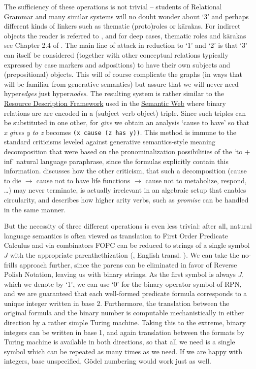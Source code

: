 \documentclass[output=paper,colorlinks=true,citecolor=brown]{langscibook}
\begin{document}
The sufficiency of these operations is not trivial -- students of Relational
Grammar and many similar systems will no doubt wonder about `3' and perhaps
different kinds of linkers such as thematic (proto)roles or k\={a}rakas. For
indirect objects the reader is referred to \citet{Kornai:2012}, and for deep
cases, thematic roles and k\={a}rakas see Chapter 2.4 of \citet{Kornai:2022}.
The main line of attack in reduction to `1' and `2' is that `3' can itself be
considered (together with other conceptual relations typically expressed by
case markers and adpositions) to have their own subjects and (prepositional)
objects. This will of course complicate the graphs (in ways that will be
familiar from generative semantics) but assure that we will never need
hyper{\it edges} just hyper{\it nodes}. The resulting system is rather similar
to the
\href{https://en.wikipedia.org/wiki/Resource_Description_Framework}{Resource
  Description Framework} used in the
\href{https://en.wikipedia.org/wiki/Semantic_Web}{Semantic Web} where binary
relations are are encoded in a (subject verb object) triple. Since such
triples can be substituted in one other, for {\it give} we obtain an analysis
`cause to have' so that {\it x gives y to z} becomes \texttt{(x cause (z has
  y))}. This method is immune to the standard criticisms \citep{Fodor:1970}
leveled against generative semantics-style meaning decomposition that were
based on the pronominalization possibilities of the `to + inf' natural
language paraphrase, since the formulas explicitly contain this information.
\citet{Kornai:2010} discusses how the other criticism, that such a
decomposition (cause to die $\rightarrow$ cause not to have life functions
$\rightarrow$ cause not to metabolize, respond, \ldots) may never terminate,
is actually irrelevant in an algebraic setup that enables circularity, and
\citet{Kornai:2012} describes how higher arity verbs, such as {\it promise} can
be handled in the same manner. 

But the necessity of three different operations is even less trivial: after all,
natural language semantics is often viewed as translation to First Order
Predicate Calculus \citep{Blackburn:2015} and via combinators
\citep{Curry:1958} FOPC can be reduced to strings of a single symbol $J$ with
the appropriate parenthethization (\cite{Schoenfinkel:1924}, English
transl. \cite{Heijenoort:1967}). We can take the no-frills approach further,
since the parens can be eliminated in favor of Reverse Polish Notation,
leaving us with binary strings. As the first symbol is always $J$, which we
denote by `1', we can use `0' for the binary operator symbol of RPN, and we
are guaranteed that each well-formed predicate formula corresponds to a unique
integer written in base 2. Furthermore, the translation between the original
formula and the binary number is computable mechanistically in either
direction by a rather simple Turing machine. Taking this to the extreme,
binary integers can be written in base 1, and again translation between the
formats by Turing machine is available in both directions, so that all we need
is a single symbol which can be repeated as many times as we need. If we are
happy with integers, base unspecified, G\"odel numbering would work just as
well.
\end{document}
